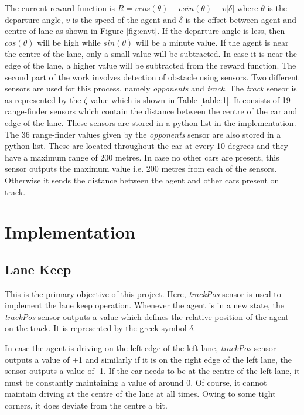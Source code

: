 The current reward function is $R = v cos(\theta) - v sin(\theta) - v |\delta|$ where $\theta$ is the departure angle, $v$ is the speed of the agent and $\delta$ is the offset between agent and centre of lane as shown in Figure \ref{fig:envt}. If the departure angle is less, then $cos(\theta)$ will be high while $sin(\theta)$ will be a minute value. If the agent is near the centre of the lane, only a small value will be subtracted. In case it is near the edge of the lane, a higher value will be subtracted from the reward function. The second part of the work involves detection of obstacle using sensors. Two different sensors are used for this process, namely \emph{opponents} and \emph{track}. The \emph{track} sensor is as represented by the $\zeta$ value which is shown in Table \ref{table:1}. It consists of 19 range-finder sensors which contain the distance between the centre of the car and edge of the lane. These sensors are stored in a python list in the implementation. The 36 range-finder values given by the \emph{opponents} sensor are also stored in a python-list. These are located throughout the car at every 10 degrees and they have a maximum range of 200 metres. In case no other cars are present, this sensor outputs the maximum value i.e. 200 metres from each of the sensors. Otherwise it sends the distance between the agent and other cars present on track. 

\section{Implementation}

\subsection{Lane Keep}
This is the primary objective of this project. Here, \emph{trackPos} sensor is used to implement the lane keep operation. Whenever the agent is in a new state, the \emph{trackPos} sensor outputs a value which defines the relative position of the agent on the track. It is represented by the greek symbol $\delta. $ 


In case the agent is driving on the left edge of the left lane, \emph{trackPos} sensor outputs a value of +1 and similarly if it is on the right edge of the left lane, the sensor outputs a value of -1. If the car needs to be at the centre of the left lane, it must be constantly maintaining a value of around 0. Of course, it cannot maintain driving at the centre of the lane at all times. Owing to some tight corners, it does deviate from the centre a bit.

